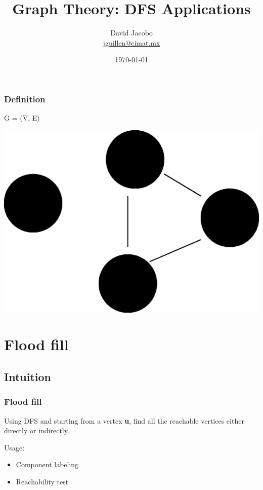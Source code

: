 \documentclass[article]{beamer}
\title{Graph Theory: DFS Applications}
\author{David Jacobo \\ \href{mailto:jguillen@cimat.mx}{jguillen@cimat.mx}}
\date{\scriptsize{\today}}
\begin{document}
\maketitle			
			
\begin{frame}
\frametitle{Definition}
\begin{center}
\huge
	G = (V, E)
	
\vspace{8mm}	
	
\includegraphics[scale=0.3]{./figures/graph.eps}
\end{center}
\end{frame}


\section{Flood fill}
\subsection{Intuition}
\begin{frame}
	\frametitle{Flood fill}
	Using DFS and starting from a vertex \textbf{u}, find all the reachable vertices either directly or indirectly.
	
	\vspace{5mm}
	
	
	Usage:
	\begin{itemize}
		\item Component labeling
		\item Reachability test
	\end{itemize}
\end{frame}
\end{document}
